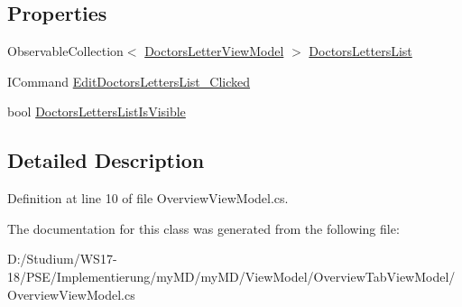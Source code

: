 \subsection*{Properties}
\begin{CompactItemize}
\item 
\hypertarget{classmy_m_d_1_1_view_model_1_1_overview_tab_view_model_1_1_overview_view_model_f897f296b368232ab8fd051299645e79}{
Observable\-Collection$<$ \hyperlink{classmy_m_d_1_1_view_model_1_1_overview_tab_view_model_1_1_doctors_letter_view_model}{Doctors\-Letter\-View\-Model} $>$ \hyperlink{classmy_m_d_1_1_view_model_1_1_overview_tab_view_model_1_1_overview_view_model_f897f296b368232ab8fd051299645e79}{Doctors\-Letters\-List}}
\label{dc/d21/classmy_m_d_1_1_view_model_1_1_overview_tab_view_model_1_1_overview_view_model_f897f296b368232ab8fd051299645e79}

\item 
\hypertarget{classmy_m_d_1_1_view_model_1_1_overview_tab_view_model_1_1_overview_view_model_f980bc6f5e3c0ca88a575429acc4efa6}{
ICommand \hyperlink{classmy_m_d_1_1_view_model_1_1_overview_tab_view_model_1_1_overview_view_model_f980bc6f5e3c0ca88a575429acc4efa6}{Edit\-Doctors\-Letters\-List\_\-Clicked}}
\label{dc/d21/classmy_m_d_1_1_view_model_1_1_overview_tab_view_model_1_1_overview_view_model_f980bc6f5e3c0ca88a575429acc4efa6}

\item 
\hypertarget{classmy_m_d_1_1_view_model_1_1_overview_tab_view_model_1_1_overview_view_model_3d8e05041bc8b83b6f77b22b393b2d4b}{
bool \hyperlink{classmy_m_d_1_1_view_model_1_1_overview_tab_view_model_1_1_overview_view_model_3d8e05041bc8b83b6f77b22b393b2d4b}{Doctors\-Letters\-List\-Is\-Visible}}
\label{dc/d21/classmy_m_d_1_1_view_model_1_1_overview_tab_view_model_1_1_overview_view_model_3d8e05041bc8b83b6f77b22b393b2d4b}

\end{CompactItemize}


\subsection{Detailed Description}




Definition at line 10 of file Overview\-View\-Model.cs.

The documentation for this class was generated from the following file:\begin{CompactItemize}
\item 
D:/Studium/WS17-18/PSE/Implementierung/my\-MD/my\-MD/View\-Model/Overview\-Tab\-View\-Model/Overview\-View\-Model.cs\end{CompactItemize}
